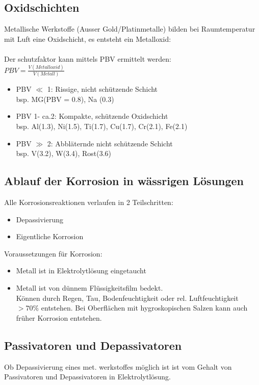 \subsection{Oxidschichten}
Metallische Werkstoffe (Ausser Gold/Platinmetalle) bilden bei Raumtemperatur mit Luft eine Oxidschicht, es entsteht ein Metalloxid:\\
\\
Der schutzfaktor kann mittels PBV ermittelt werden:\\
$PBV = \frac{V(Metalloxid)}{V(Metall)}$\\
\begin{itemize}
    \item PBV $\ll$ 1: Rissige, nicht schützende Schicht\\
    bsp. MG(PBV = 0.8), Na (0.3)
    \item PBV 1- ca.2: Kompakte, schützende Oxidschicht\\
    bsp. Al(1.3), Ni(1.5), Ti(1.7), Cu(1.7), Cr(2.1), Fe(2.1)
    \item PBV $\gg$ 2: Abbläternde nicht schützende Schicht\\
    bsp. V(3.2), W(3.4), Rost(3.6)
\end{itemize}
\subsection{Ablauf der Korrosion in wässrigen Lösungen}
Alle Korrosionsreaktionen verlaufen in 2 Teilschritten:\\
\begin{itemize}
    \item Depassivierung
    \item Eigentliche Korrosion
\end{itemize}
Voraussetzungen für Korrosion:\\
\begin{itemize}
    \item Metall ist in Elektrolytlösung eingetaucht
    \item Metall ist von dünnem Flüssigkeitsfilm bedekt.\\
    Können durch Regen, Tau, Bodenfeuchtigkeit oder rel. Luftfeuchtigkeit $> 70\%$ entstehen. Bei Oberflächen mit hygroskopischen Salzen kann auch früher Korrosion entstehen.
\end{itemize}
\subsection{Passivatoren und Depassivatoren}
Ob Depassivierung eines met. werkstoffes möglich ist ist vom Gehalt von Passivatoren und Depassivatoren in Elektrolytlösung.
